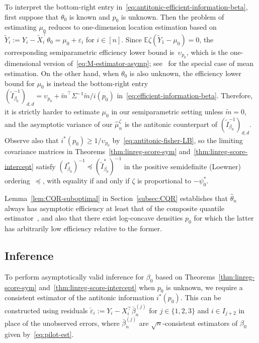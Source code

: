 \documentclass[a4paper]{article}
\newcommand{\E}{\mathbb{E}}
\theoremstyle{definition}
\begin{document}
To interpret the bottom-right entry in~\eqref{eq:antitonic-efficient-information-beta}, first suppose that $\theta_0$ is known and $p_0$ is unknown. Then the problem of estimating $\mu_0$ reduces to one-dimension location estimation based on 
$\tilde{Y}_i := Y_i - \tilde{X}_i^\top\theta_0 = \mu_0 + \varepsilon_i$ for $i \in [n]$. Since $\E\zeta(\tilde{Y}_1 - \mu_0) = 0$, the corresponding semiparametric efficiency lower bound is~$\upsilon_{p_0}$, which is the one-dimensional version of~\eqref{eq:M-estimator-asymp}; see~\citet[Example~25.24]{vdV1998asymptotic} for the special case of mean estimation. On the other hand, when $\theta_0$ is also unknown, the efficiency lower bound for $\mu_0$ is instead the bottom-right entry $(\tilde{I}_{\beta_0}^{-1})_{d,d} = \upsilon_{p_0} + \tilde{m}^\top\Sigma^{-1}\tilde{m}/i(p_0)$ in~\eqref{eq:efficient-information-beta}. Therefore, it is strictly harder to estimate $\mu_0$ in our semiparametric setting unless $\tilde{m} = 0$, and the asymptotic variance of our $\hat{\mu}_n^\zeta$ is the antitonic counterpart of $(\tilde{I}_{\beta_0}^{-1})_{d,d}$.  Observe also that $i^*(p_0) \geq 1/\upsilon_{p_0}$ by~\eqref{eq:antitonic-fisher-LB}, so the limiting covariance matrices in Theorems~\ref{thm:linreg-score-sym} and~\ref{thm:linreg-score-intercept} satisfy $(I_{\beta_0}^*)^{-1} \preceq (\tilde{I}_{\beta_0}^*)^{-1}$ in the positive semidefinite (Loewner) ordering~$\preceq$, with equality if and only if $\zeta$ is proportional to $-\psi_0^*$.

Lemma~\ref{lem:CQR-suboptimal} in Section~\ref{subsec:CQR} establishes that $\hat{\theta}_n$ always has asymptotic efficiency at least that of the composite quantile estimator~\citep{zou2008composite}, and also that there exist log-concave densities $p_0$ for which the latter has arbitrarily low efficiency relative to the former.

\subsection{Inference}
\label{subsec:linreg-inference}

To perform asymptotically valid inference for $\beta_0$ based on Theorems~\ref{thm:linreg-score-sym} and~\ref{thm:linreg-score-intercept} when $p_0$ is unknown, we require a consistent estimator of the antitonic information $i^*(p_0)$. This can be constructed using residuals $\check{\varepsilon}_i := Y_i - X_i^\top\bar{\beta}_n^{(j)}$ for $j \in \{1,2,3\}$ and $i \in I_{j+2}$ in place of the unobserved errors, where $\bar{\beta}_n^{(j)}$ are $\sqrt{n}$-consistent estimators of $\beta_0$ given by~\eqref{eq:pilot-est}.
\end{document}
